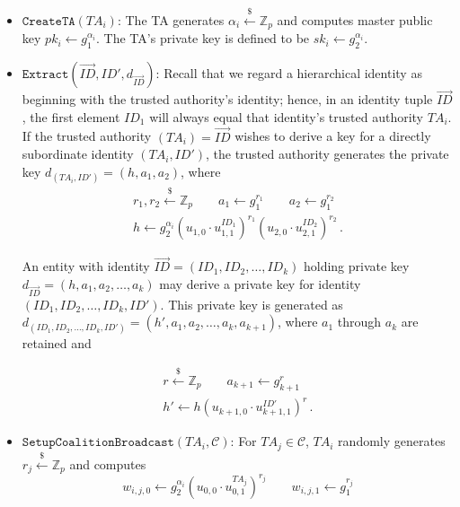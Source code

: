 \documentclass{IEEEtran}
\newcommand{\C}{\mathcal{C}}
\newcommand{\Zbb}{\mathbb{Z}}
\newcommand{\ID}{\mathit{ID}}
\newcommand{\TA}{\mathit{TA}}
\newcommand{\sk}{\mathit{sk}}
\newcommand{\getsr}{\stackrel{{\scriptscriptstyle\$}}{\gets}}
\begin{document}
\begin{itemize}
\item $\texttt{CreateTA}(\TA_i)$: The TA generates
$\alpha_i \getsr \Zbb_{p}$ and computes master public key
$pk_i \gets g_{1}^{\alpha_i}$. The TA's private key is defined
to be $\sk_i \gets g_{2}^{\alpha_i}$.\medskip

\item $\texttt{Extract}(\vec{\ID},\ID',d_{\vec{\ID}})$: Recall
that we regard a hierarchical identity as beginning with the
trusted authority's identity; hence, in an identity tuple
$\vec{ID}$, the first element $ID_1$ will always equal that
identity's trusted authority $\TA_i$. If the trusted authority
$(\TA_i) = \vec{\ID}$ wishes to derive a key for a directly
subordinate identity $(\TA_i, \ID')$, the trusted authority
generates the private key $d_{(\TA_i, \ID')} = (h, a_1, a_2)$,
where
\begin{displaymath}
\begin{array}{c}
    r_{1},r_{2} \getsr \Zbb_{p} \qquad a_{1} \gets g_{1}^{r_{1}} \qquad a_{2} \gets g_{1}^{r_{2}}\\
    h \gets g_{2}^{\alpha_{i}} (u_{1,0} \cdot u_{1,1}^{ID_{1}})^{r_{1}}
    (u_{2,0} \cdot u_{2,1}^{ID_{2}})^{r_{2}} \, .
\end{array}
\end{displaymath}

An entity with identity $\vec{\ID} = (\ID_1, \ID_2, \ldots,
\ID_k)$ holding private key $d_{\vec{\ID}} = (h, a_1, a_2, \ldots,
a_k)$ may derive a private key for identity $(\ID_1, \ID_2,
\ldots,\ID_k, \ID')$. This private key is generated as $d_{(\ID_1,
\ID_2, \ldots, \ID_k, \ID')} = (h', a_1, a_2, \ldots, a_k, a_{k+1})$,
where $a_1$ through $a_k$ are retained and

\begin{displaymath}
\begin{array}{c}
    r \getsr \Zbb_{p} \qquad a_{k+1} \gets g_{k+1}^{r}\\
    h' \gets h (u_{k+1,0} \cdot u_{k+1,1}^{ID'})^r \, .
\end{array}
\end{displaymath}

\item $\texttt{SetupCoalitionBroadcast}(\TA_i, \C)$: For $\TA_j \in \C$, $\TA_i$ randomly generates $r_{j}\getsr \Zbb_{p}$ and computes
\begin{displaymath}
    w_{i,j,0} \gets g_{2}^{\alpha_i}(u_{0,0} \cdot
    u_{0,1}^{\TA_{j}})^{r_{j}} \qquad w_{i,j,1} \gets
    g_{1}^{r_{j}}
\end{displaymath}


\end{itemize}
\end{document}
